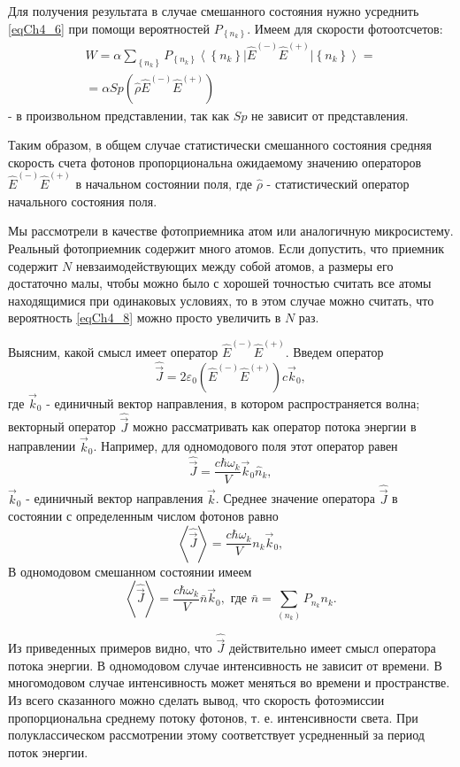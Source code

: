 Для получения результата в случае смешанного состояния нужно усреднить
\eqref{eqCh4_6} при помощи вероятностей  $P_{\left\{n_k\right\}}$.
Имеем для скорости фотоотсчетов: 
\begin{eqnarray}
W = \alpha \sum_{\left\{n_k\right\}}P_{\left\{n_k\right\}}
\left<\left\{n_k\right\}\right|\hat{E}^{(-)}\hat{E}^{(+)}\left|\left\{n_k\right\}\right> =
\nonumber \\
=
\alpha Sp\left(\hat{\rho}\hat{E}^{(-)}\hat{E}^{(+)}\right)
\label{eqCh4_8}
\end{eqnarray}
- в произвольном представлении, так как $Sp$ не зависит от
представления.

Таким образом, в общем случае статистически смешанного состояния
средняя скорость счета фотонов пропорциональна ожидаемому значению
операторов $\hat{E}^{(-)}\hat{E}^{(+)}$ в начальном состоянии поля,
где $\hat{\rho}$ - статистический оператор начального состояния поля.  

Мы рассмотрели в качестве фотоприемника атом или аналогичную
микросистему. Реальный фотоприемник содержит много атомов. Если
допустить, что приемник содержит $N$ невзаимодействующих между собой
атомов, а размеры его достаточно малы, чтобы можно было с хорошей
точностью считать все атомы находящимися при одинаковых условиях, то в
этом случае можно считать, что вероятность \eqref{eqCh4_8} можно
просто увеличить в $N$ раз. 

Выясним, какой смысл имеет оператор $\hat{E}^{(-)}\hat{E}^{(+)}$.
Введем оператор 
\begin{equation}
\hat{\vec{J}} = 2 \varepsilon_0
\left(\hat{E}^{(-)}\hat{E}^{(+)}\right) c \vec{k}_0,
\label{eqCh4_9}
\end{equation}
где $\vec{k}_0$ - единичный вектор направления, в котором
распространяется волна; векторный оператор
$\hat{\vec{J}}$ можно рассматривать как 
оператор потока энергии в направлении  $\vec{k}_0$.  Например, для
одномодового поля этот оператор равен 
\begin{equation}
\hat{\vec{J}} = \frac{c \hbar \omega_k}{V} \vec{k}_0 \hat{n}_k,
\label{eqCh4_10}
\end{equation}
$\vec{k}_0$ - единичный вектор направления $\vec{k}$.  Среднее
значение оператора $\hat{\vec{J}}$ в состоянии с определенным числом
фотонов равно  
\[
\left<\hat{\vec{J}}\right> = \frac{c \hbar \omega_k}{V} n_k \vec{k}_0,
\]
В одномодовом смешанном состоянии имеем
\[
\left<\hat{\vec{J}}\right> = \frac{c \hbar \omega_k}{V} \bar{n} \vec{k}_0,   \mbox{ где }   \bar{n} = \sum_{(n_k)}P_{n_k} n_k.
\]

Из приведенных примеров видно, что $\hat{\vec{J}}$ действительно имеет смысл
оператора потока энергии. В одномодовом случае интенсивность не
зависит от времени. В многомодовом случае интенсивность может меняться
во времени и пространстве. Из всего сказанного можно сделать вывод,
что скорость фотоэмиссии пропорциональна среднему потоку фотонов,
т. е. интенсивности света. При полуклассическом рассмотрении этому
соответствует усредненный за период поток энергии. 
